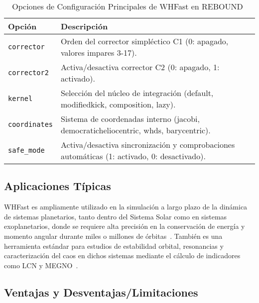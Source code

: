 \begin{table}[h]
\centering
\caption{Opciones de Configuración Principales de WHFast en REBOUND~\cite{ReboundIntegratorsDoc}}%
\label{tab:whfast_options}
    \begin{tabular}{lp{10cm}}
    \hline
    \textbf{Opción} & \textbf{Descripción} \\
    \hline
    \texttt{corrector} & Orden del corrector simpléctico C1 (0: apagado, valores impares 3-17). \\
    \texttt{corrector2} & Activa/desactiva corrector C2 (0: apagado, 1: activado). \\
    \texttt{kernel} & Selección del núcleo de integración (default, modifiedkick, composition, lazy). \\
    \texttt{coordinates} & Sistema de coordenadas interno (jacobi, democraticheliocentric, whds, barycentric). \\
    \texttt{safe\_mode} & Activa/desactiva sincronización y comprobaciones automáticas (1: activado, 0: desactivado). \\
    \hline
    \end{tabular}
\end{table}

\subsection{Aplicaciones Típicas}

WHFast es ampliamente utilizado en la simulación a largo plazo de la dinámica de sistemas planetarios, tanto dentro del Sistema Solar como en sistemas exoplanetarios, donde se requiere alta precisión en la conservación de energía y momento angular durante miles o millones de órbitas~\cite{ReinTamayo2015, Rein2012}. También es una herramienta estándar para estudios de estabilidad orbital, resonancias y caracterización del caos en dichos sistemas mediante el cálculo de indicadores como LCN y MEGNO~\cite{ReinTamayo2015}.

\subsection{Ventajas y Desventajas/Limitaciones}

